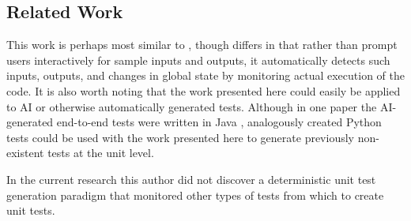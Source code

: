 \subsection{Related Work}\label{sec:related-work}
This work is perhaps most similar to 
\cite{lahiri2023interactivecodegenerationtestdriven}, though
differs in that rather than prompt users interactively for sample inputs and
outputs, it automatically detects such inputs, outputs, and changes in global
state by monitoring actual execution of the code.  It is also worth noting 
that the work presented here could easily be applied to AI or otherwise 
automatically generated tests.  Although in one paper the AI-generated end-to-end tests 
were written in Java \cite{leotta2024ai}, analogously created Python tests could
be used with the work presented here to generate previously non-existent 
tests at the unit level.

In the current research this author did not discover a deterministic 
unit test generation paradigm that monitored other types of
tests from which to create unit tests.
